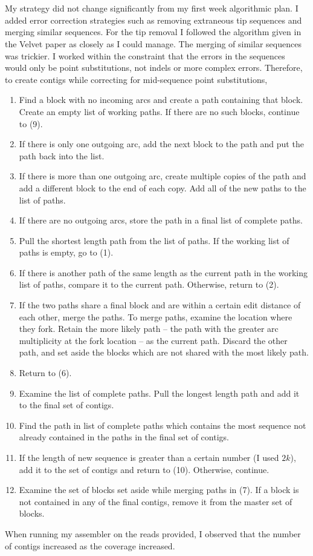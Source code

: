 \documentclass[10pt,letterpaper]{article}
\begin{document}
\section{}
My strategy did not change significantly from my first week algorithmic plan. I added error correction strategies such as removing extraneous tip sequences and merging similar sequences. For the tip removal I followed the algorithm given in the Velvet paper as closely as I could manage. The merging of similar sequences was trickier. I worked within the constraint that the errors in the sequences would only be point substitutions, not indels or more complex errors. Therefore, to create contigs while correcting for mid-sequence point substitutions,
\begin{enumerate}
 \item Find a block with no incoming arcs and create a path containing that block. Create an empty list of working paths. If there are no such blocks, continue to (9).
 \item If there is only one outgoing arc, add the next block to the path and put the path back into the list.
 \item If there is more than one outgoing arc, create multiple copies of the path and add a different block to the end of each copy. Add all of the new paths to the list of paths.
 \item If there are no outgoing arcs, store the path in a final list of complete paths.
 \item Pull the shortest length path from the list of paths. If the working list of paths is empty, go to (1).
 \item If there is another path of the same length as the current path in the working list of paths, compare it to the current path. Otherwise, return to (2).
 \item If the two paths share a final block and are within a certain edit distance of each other, merge the paths. To merge paths, examine the location where they fork. Retain the more likely path -- the path with the greater arc multiplicity at the fork location -- as the current path. Discard the other path, and set aside the blocks which are not shared with the most likely path.
 \item Return to (6).
 \item Examine the list of complete paths. Pull the longest length path and add it to the final set of contigs.
 \item Find the path in list of complete paths which contains the most sequence not already contained in the paths in the final set of contigs.
 \item If the length of new sequence is greater than a certain number (I used $2k$), add it to the set of contigs and return to (10). Otherwise, continue.
 \item Examine the set of blocks set aside while merging paths in (7). If a block is not contained in any of the final contigs, remove it from the master set of blocks.
\end{enumerate}



When running my assembler on the reads provided, I observed that the number of contigs increased as the coverage increased.
\end{document}
